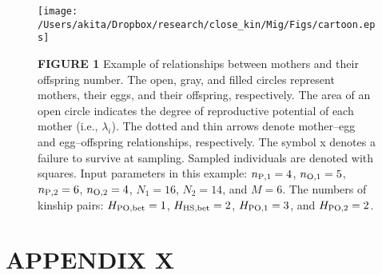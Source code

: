 \documentclass[12pt, English]{article}
\begin{document}
\begin{spacing}{1.9}
\clearpage

\newcommand{\figcapa}{Example of relationships between mothers and their offspring number. The open, gray, and filled circles represent mothers, their eggs, and their offspring, respectively. The area of an open circle indicates the degree of reproductive potential of each mother (i.e., $\lambda_i$). The dotted and thin arrows denote mother--egg and egg--offspring relationships, respectively. The symbol x denotes a failure to survive at sampling. Sampled individuals are denoted with squares. Input parameters in this example: $n_{\rm P, 1}=4$, $n_{\rm O, 1}=5$, $n_{\rm P, 2}=6$, $n_{\rm O, 2}=4$, $N_{1}=16$, $N_{2}=14$, and $M=6$. The numbers of kinship pairs: $H_{\rm PO, bet}=1$, $H_{\rm HS, bet}=2$, $H_{\rm PO, 1}=3$, and $H_{\rm PO, 2}=2$.}

\newcommand{\figcapb}{Violin plots showing the distribution of relative bias in our estimator (Eq.~\ref{NeN_hat2}) for various values of $c$ and sample size. Filled circles represent the mean values. Sample sizes for mothers and offspring are identical (i.e., $n=n_{\rm M} = n_{\rm O}$) and indicated in the legend. For the demonstration purposes, the distribution is truncated, although the mean values are calculated including the truncated values. (a) $N_{\rm m}=1{,}000$, (b) $N_{\rm m}=10{,}000$.}

\newcommand{\figcapsg}{Violin plots showing the distribution of relative bias of $N_{\rm e}/N$ (denoted in Eq.~\ref{NeN_wang}) for various sample sizes. Filled circles represent the mean values. The sample numbers of parents and offspring are identical (i.e., $n=n_{\rm P} = n_{\rm O}$) and indicated in the legend. For demonstration purposes, the distribution is truncated, although the mean values are calculated including the truncated values. (a) $N=2{,}000$, (b) $N=20{,}000$.}

\begin{figure}[!h]
	\begin{center}
		\texttt{[image: /Users/akita/Dropbox/research/close\_kin/Mig/Figs/cartoon.eps]}
		\caption{{\bf FIGURE 1} \figcapa{}}
		\label{cartoon}
	\end{center}
\end{figure}


\clearpage

\section*{APPENDIX X}
\setcounter{equation}{0}



\end{spacing}
\end{document}
